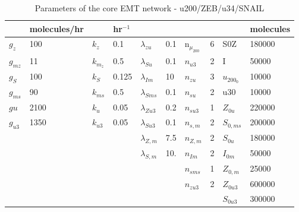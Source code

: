 \documentclass{article}
\begin{document}
\begin{table}[]
\begin{tabular}{ll|ll|ll|ll|ll}
                & molecules/hr  &               & hr$^{-1}$    &                       &               &                       &               &                       & molecules     \\
\hline
$g_z$           & 100           & $k_z$         & 0.1           & $\lambda_{zu}$        & 0.1           & n$_{\mu_{200}}$       & 6             & S0Z                   & 180000        \\
$g_{mz}$        & 11            & $k_{m_{z}}$   & 0.5           & $\lambda_{Su}$        & 0.1           & $n_{u3}$              & 2             & I                     & 50000         \\
$g_S$           & 100           & $k_S$         & 0.125         & $\lambda_{Im}$        & 10            & $n_{zu}$              & 3             & $u_{200_{0}}$         & 10000         \\
$g_{ms}$        & 90            & $k_{ms}$      & 0.5           & $\lambda_{Sms}$       & 0.1           & $n_{su}$              & 2             & u30                   & 10000         \\
$gu$            & 2100          & $k_u$         & 0.05          & $\lambda_{Zu3}$       & 0.2           & $n_{su3}$             & 1             & $Z_{0u}$              & 220000        \\
$ g_{u3}$       & 1350          & $k_{u3}$      & 0.05          & $\lambda_{Su3}$       & 0.1           & $n_{s,m}$             & 2             & $S_{0,ms}$            & 200000        \\
                &               &               &               & $\lambda_{Z,m}$       & 7.5           & $n_{Z,m}$             & 2             & $S_{0u}$              & 180000        \\
                &               &               &               & $\lambda_{S,m}$       & 10.           & $n_{Im}$              & 2             & $I_{0m}$              & 50000         \\
                &               &               &               &                       &               & $n_{sms}$             & 1             & $Z_{0,m}$             & 25000         \\
                &               &               &               &                       &               & $n_{zu3}$             & 2             & $Z_{0u3}$             & 600000        \\
                &               &               &               &                       &               &                       &               & $S_{0u3}$             & 300000        \\
\end{tabular}
\caption{Parameters of the core EMT network  -  u200/ZEB/u34/SNAIL}
\label{table:eparams}
\end{table}
\end{document}
